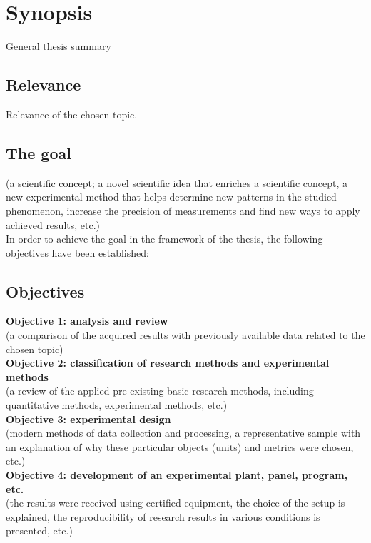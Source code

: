 \chapter*{Synopsis}

\begin{center}
    General thesis summary
\end{center}

\section*{Relevance}
Relevance of the chosen topic.
\section*{The goal}
(a scientific concept; a novel scientific idea that enriches a scientific concept, a new experimental method that helps determine new patterns in the studied phenomenon, increase the precision of measurements and find new ways to apply achieved results, etc.)\\

In order to achieve the goal in the framework of the thesis, the following objectives have been established:
\section*{Objectives}
\textbf{Objective 1: analysis and review}\\
(a comparison of the acquired results with previously available data related to the chosen topic)\\

\textbf{Objective 2: classification of research methods and experimental methods} \\
(a review of the applied pre-existing basic research methods, including quantitative methods, experimental methods, etc.)\\

\textbf{Objective 3: experimental design}\\
(modern methods of data collection and processing, a representative sample with an explanation of why these particular objects (units) and metrics were chosen, etc.) \\

\textbf{Objective 4: development of an experimental plant, panel, program, etc.}\\
(the results were received using certified equipment, the choice of the setup is explained, the reproducibility of research results in various conditions is presented, etc.)\\

